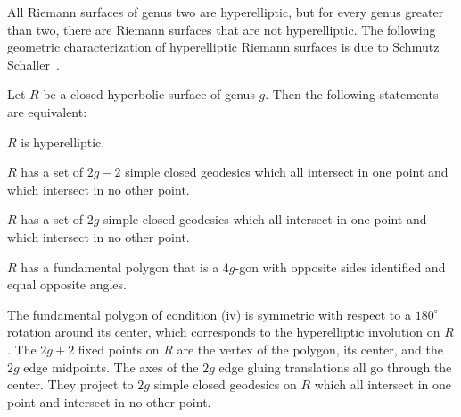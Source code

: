 \documentclass[Thesis]{subfiles}
\begin{document}
All Riemann surfaces of genus two are hyperelliptic, but for
every genus greater than two, there are Riemann surfaces that are not
hyperelliptic. The following geometric characterization of
hyperelliptic Riemann surfaces is due to Schmutz
Schaller~\cite{schmutz1998, schmutz1999}.

\begin{theorem}
  \label{thm:schmutz_schaller}
  Let $R$ be a closed hyperbolic surface of genus $g$. Then the
  following statements are equivalent:
  \begin{compactenum}[(i)]
  \item $R$ is hyperelliptic.
  \item $R$ has a set of $2g-2$ simple closed geodesics which all
    intersect in one point and which intersect in no other point.
  \item $R$ has a set of $2g$ simple closed geodesics which all
    intersect in one point and which intersect in no other point.
  \item $R$ has a fundamental polygon that is a $4g$-gon with opposite
    sides identified and equal opposite angles.
  \end{compactenum}
\end{theorem}

The fundamental polygon of condition (iv) is symmetric with respect
to a $180^{\circ}$ rotation around its center, which corresponds to
the hyperelliptic involution on $R$. The $2g+2$ fixed points on $R$
are the vertex of the polygon, its center, and the $2g$ edge
midpoints. The axes of the $2g$ edge gluing translations all go
through the center. They project to $2g$ simple closed
geodesics on $R$ which all intersect in one point and intersect in no
other point. 


\end{document}
